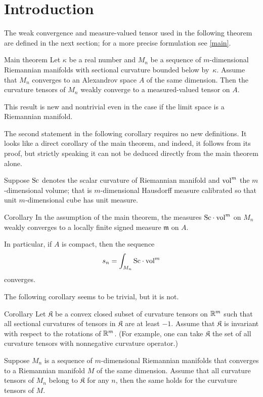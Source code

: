 \section{Introduction}

The weak convergence and measure-valued tensor used in the following theorem are defined in the next section;
for a more precise formulation see \ref{main}.

\begin{thm}{Main theorem}
Let $\kappa$ be a real number and 
$M_n$ be a sequence of $m$-dimensional Riemannian manifolds with sectional curvature bounded below by~$\kappa$.
Assume that $M_n$ converges to an Alexandrov space $A$ of the same dimension.
Then the curvature tensors of $M_n$ weakly converge to a measured-valued tensor on $A$.
\end{thm}

This result is new and nontrivial even in the case if the limit space is a Riemannian manifold.

The second statement in the following corollary requires no new definitions.
It looks like a direct corollary of the main theorem, 
and indeed, it follows from its proof, but strictly speaking it can not be deduced directly from the main theorem alone.

Suppose $\operatorname{\rm Sc}$ denotes the scalar curvature of Riemannian manifold and $\operatorname{vol}^m$ the $m$-dimensional volume; that is $m$-dimensional Hausdorff measure calibrated so that unit $m$-dimensional cube has unit measure.

\begin{thm}{Corollary}\label{cor:Sc}
In the assumption of the main theorem,
the measures $\Sc\cdot \vol^m$ on $M_n$ weakly converges to a locally finite signed measure $\mathfrak m$  on $A$.

In particular, if $A$ is compact, then the sequence
\[s_n=\int_{M_n}\Sc \cdot\vol^m\]
converges.
\end{thm}

The following corollary seems to be trivial, but it is not.

\begin{thm}{Corollary}
Let $\mathfrak{K}$ be a convex closed subset of curvature tensors on $\mathbb{R}^m$ 
such that 
all sectional curvatures of tensors in $\mathfrak{K}$ are at least $-1$.
Assume that $\mathfrak{K}$ is invariant with respect to the rotations of $\mathbb{R}^m$.
(For example, one can take $\mathfrak{K}$ the set of all curvature tensors with nonnegative curvature operator.)

Suppose $M_n$ is a sequence of $m$-dimensional Riemannian manifolds that converges to a Riemannian manifold $M$ of the same dimension.
Assume that all curvature tensors of $M_n$ belong to $\mathfrak{K}$ for any $n$,
then the same holds for the curvature tensors of $M$.
\end{thm}



